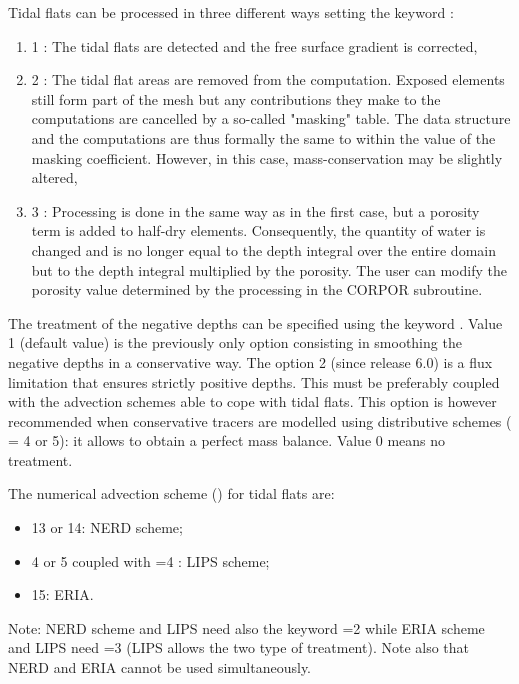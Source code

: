  Tidal flats can be processed in three different ways setting the keyword :

\begin{enumerate}
\item  [\nonumber] 1 : The tidal flats are detected and the free surface gradient is corrected,

\item  [\nonumber] 2 : The tidal flat areas are removed from the computation. Exposed elements still form part of the mesh but any contributions they make to the computations are cancelled by a so-called "masking" table. The data structure and the computations are thus formally the same to within the value of the masking coefficient. However, in this case, mass-conservation may be slightly altered,

\item [\nonumber] 3 : Processing is done in the same way as in the first case, but a porosity term is added to half-dry elements. Consequently, the quantity of water is changed and is no longer equal to the depth integral over the entire domain but to the depth integral multiplied by the porosity. The user can modify the porosity value determined by the processing in the CORPOR subroutine.
\end{enumerate}


 The treatment of the negative depths can be specified using the keyword . Value 1 (default value) is the previously only option consisting in smoothing the negative depths in a conservative way. The option 2 (since release 6.0) is a flux limitation that ensures strictly positive depths. This must be preferably coupled with the advection schemes able to cope with tidal flats. This option is however recommended when conservative tracers are modelled using distributive schemes ( = 4 or 5): it allows to obtain a perfect mass balance. Value 0 means no treatment.

 The numerical advection scheme () for tidal flats are:
\begin{itemize}
\item 13 or 14: NERD scheme;
\item 4 or 5 coupled with =4 : LIPS scheme;
\item 15: ERIA.
\end{itemize}

\begin{WarningBlock}{Note:}
NERD scheme and LIPS need also the keyword =2 while ERIA scheme and LIPS need =3 (LIPS allows the two type of treatment). Note also that NERD and ERIA cannot be used simultaneously.
\end{WarningBlock}

